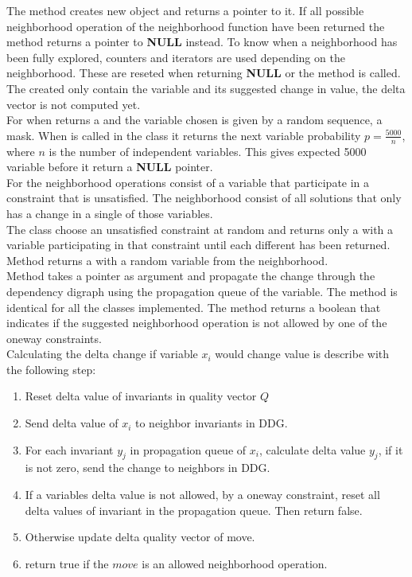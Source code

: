 The method  creates new  object and returns a pointer to it. If all possible neighborhood 
operation of the neighborhood function have been returned the method returns a pointer to \textbf{NULL} instead. To know 
when  a neighborhood has been fully explored, counters and iterators are used depending on the neighborhood. These are 
reseted when returning \textbf{NULL} or the method  is called. The  created only 
contain the variable and its suggested change in value, the delta vector is not computed yet. \\ 
For  when  returns a  and the variable chosen is given by a random 
sequence, a mask.  When  is called in the  class it returns the next variable 
probability $p = \frac{5000}{n}$, where $n$ is the number of independent variables. This gives expected 5000 variable 
before it return a \textbf{NULL} pointer. \\
For  the neighborhood operations consist of a variable that participate in a constraint that is 
unsatisfied. The neighborhood consist of all solutions that only has a change in a single of those variables. \\ 
The class  choose an unsatisfied constraint at random and returns only a  with 
a variable participating in that constraint until each different  has been returned. \\
Method  returns a  with a random variable from the neighborhood.  \\ 
Method  takes a  pointer as argument and propagate the change through the 
dependency digraph using the propagation queue of the variable. The method is identical for all the 
 classes implemented. The method returns a boolean that indicates if the suggested 
neighborhood operation is not allowed by one of the oneway constraints. \\ 
Calculating the delta change if variable $x_i$ would change value is describe with the following step:
\begin{enumerate} 
 \item Reset delta value of invariants in quality vector $Q$
 \item Send delta value of $x_i$ to neighbor invariants in DDG.
 \item For each invariant $y_j$ in propagation queue of $x_i$, calculate delta value $y_j$, if it is not zero, send 
the change to neighbors in DDG. 
 \item If a variables delta value is not allowed, by a oneway constraint, reset all delta values of invariant in 
the propagation queue. Then return false. 
 \item Otherwise update delta quality vector of move. 
\item return true if the $move$ is an allowed neighborhood operation. 
\end{enumerate} \noindent
